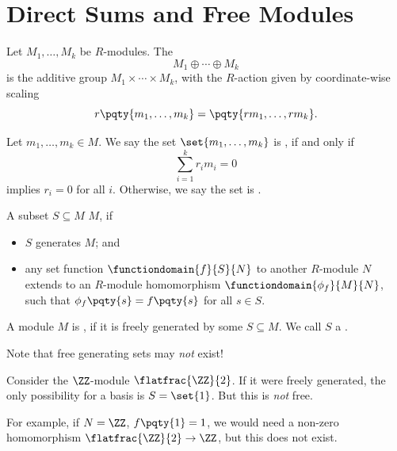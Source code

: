 \section{Direct Sums and Free Modules}

\begin{definition}
    \label{def:direct-sum-modules}%
    Let \(M_1, \ldots, M_k\) be \(R\)-modules. The 
    \[
        M_1 \oplus \cdots \oplus M_k
    \]
    is the additive group \(M_1 \times \cdots \times M_k\), with the \(R\)-action given by coordinate-wise scaling
    \[
        r\pqty{m_1, \ldots, m_k} = \pqty{r m_1, \ldots, r m_k}.
    \]
\end{definition}

\begin{definition}
    \label{def:linear-dependence}%
    Let \(m_1, \ldots, m_k \in M\). We say the set \(\set{m_1, \ldots, m_k}\) is , if and only if
    \[
        \sum_{i = 1}^{k} r_i m_i = 0
    \]
    implies \(r_i = 0\) for all \(i\). Otherwise, we say the set is .
\end{definition}

\begin{definition}
    \label{def:free-generation}%
    A subset \(S \subseteq M\)  \(M\), if
    \begin{itemize}
        \item \(S\) generates \(M\); and
        \item any set function \(\functiondomain{f}{S}{N}\) to another \(R\)-module \(N\) extends to an \(R\)-module homomorphism \(\functiondomain{\phi_f}{M}{N}\), such that \(\phi_f\pqty{s} = f\pqty{s}\) for all \(s \in S\).
    \end{itemize}

    A module \(M\) is , if it is freely generated by some \(S \subseteq M\). We call \(S\) a .
\end{definition}

Note that free generating sets may \emph{not} exist!

\begin{example}
    \label{ex:module-without-free-generating-set}%
    Consider the \(\ZZ\)-module \(\flatfrac{\ZZ}{2}\). If it were freely generated, the only possibility for a basis is \(S = \set{1}\). But this is \emph{not} free.

    For example, if \(N = \ZZ\), \(f\pqty{1} = 1\), we would need a non-zero homomorphism \(\flatfrac{\ZZ}{2} \to \ZZ\), but this does not exist.
\end{example}

